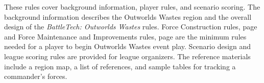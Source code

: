 These rules cover background information, player rules, and scenario scoring.
The background information describes the Outworlds Wastes region and the overall design of the \emph{BattleTech: Outworlds Wastes} rules.
Force Construction rules, page \pageref{subsec:force_construction} and Force Maintenance and Improvements rules, page \pageref{subsec:force_maintenance} are the minimum rules needed for a player to begin Outworlds Wastes event play.
Scenario design and league scoring rules are provided for league organizers.
The reference materials include a region map, a list of references, and sample tables for tracking a commander's forces.
